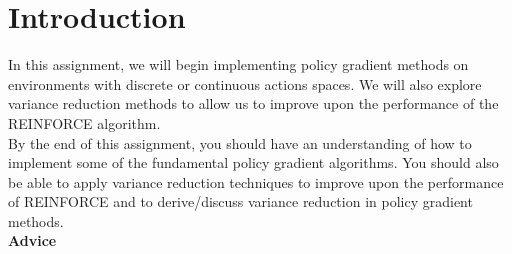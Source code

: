 \section{Introduction}

In this assignment, we will begin implementing policy gradient methods on environments with discrete or continuous actions spaces. We will also explore variance reduction methods to allow us to improve upon the performance of the REINFORCE algorithm. \\

By the end of this assignment, you should have an understanding of how to implement some of the fundamental policy gradient algorithms. You should also be able to apply variance reduction techniques to improve upon the performance of REINFORCE and to derive/discuss variance reduction in policy gradient methods. \\

\textbf{Advice}

